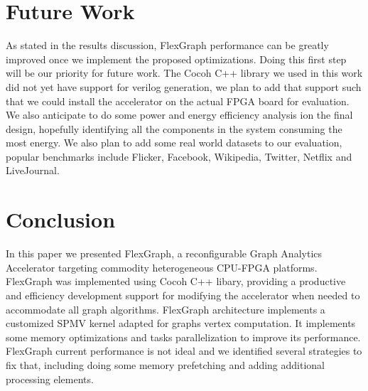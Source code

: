 \section{Future Work}

As stated in the results discussion, FlexGraph performance can be greatly improved once we implement the proposed optimizations. Doing this first step will be our priority for future work.
The Cocoh C++ library we used in this work did not yet have support for verilog generation, we plan to add that support such that we could install the accelerator on the actual FPGA board for evaluation.
We also anticipate to do some power and energy efficiency analysis ion the final design, hopefully identifying all the components in the system consuming the most energy. 
We also plan to add some real world datasets to our evaluation, popular benchmarks include Flicker, Facebook, Wikipedia, Twitter, Netflix and LiveJournal.

\section{Conclusion}

In this paper we presented FlexGraph, a reconfigurable Graph Analytics Accelerator targeting commodity heterogeneous CPU-FPGA platforms. FlexGraph was implemented using Cocoh C++ libary, providing a productive and efficiency development support for modifying the accelerator when needed to accommodate all graph algorithms. FlexGraph architecture implements a customized SPMV kernel adapted for graphs vertex computation. It implements some memory optimizations and tasks parallelization to improve its performance. FlexGraph current performance is not ideal and we identified several strategies to fix that, including doing some memory prefetching and adding additional processing elements. 